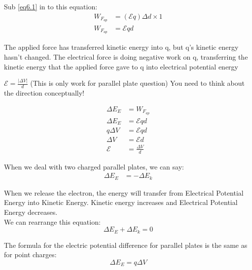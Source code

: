 Sub \ref{eq6.1} in to this equation:
\begin{align}
    W_{F_{ap}} &= (\mathcal{E}q) \Delta d \times 1 \nonumber \\
    W_{F_{ap}} &= \mathcal{E}qd 
\end{align}

The applied force has transferred kinetic energy into q, but q's kinetic energy hasn't changed. The electrical force is doing negative work on q, transferring
 the kinetic energy that the applied force gave to q into electrical potential energy

 \begin{theorem}
    $\mathcal{E} = \frac{\left | \Delta V \right |}{d}$ (This is only work for parallel plate question) You need to think about the direction conceptually!
 \end{theorem}

 \begin{align*}
    \Delta E_E &= W_{F_{ap}}\\
    \Delta E_E &= \mathcal{E}qd\\
    q \Delta V &= \mathcal{E}qd\\
    \Delta V &= \mathcal{E}d\\
    \mathcal{E} &= \frac{\Delta V}{d}
 \end{align*}

 \noindent\hrulefill

When we deal with two charged parallel plates, we can say:
\begin{align*}
    \Delta E_E &= -\Delta E_k
\end{align*}

When we release the electron, the energy will transfer from Electrical Potential Energy into Kinetic Energy. Kinetic energy increases and Electrical Potential Energy decreases. \\

We can rearrange this equation:
\begin{equation*}
    \Delta E_E + \Delta E_k = 0
\end{equation*}

\noindent\hrulefill

The formula for the electric potential difference for parallel plates is the same as for point charges:
\begin{equation}
    \Delta E_E = q\Delta V
\end{equation}

